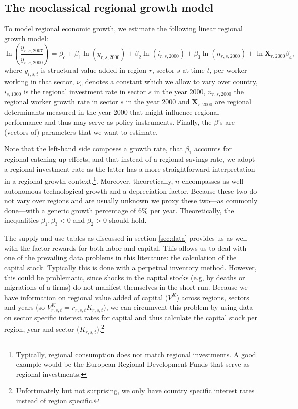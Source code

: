 \documentclass[11pt,parskip,abstracton,notitlepage, paper=a4]{scrartcl}
\begin{document}
\subsection{The neoclassical regional growth model}

To model regional economic growth, we estimate the following linear regional growth model:
\begin{equation}
	\ln\left(\frac{y_{r,s,2007}}{y_{r,s,2000}}\right)=\beta_c+\beta_1\ln(y_{r,s,2000}) + \beta_2 \ln(i_{r,s, 2000}) + \beta_3 \ln(n_{r,s, 2000}) + \ln{\mathbf{X}_{r, 2000}} \beta_4,
	\label{regionalgrowth}
\end{equation}
where $y_{i,s,t}$ is structural value added in region $r$, sector $s$ at time $t$, per worker working in that sector, $\nu_c$ denotes a constant which we allow to vary over country, $i_{s,1000}$ is the regional investment rate in sector $s$ in the year 2000, $n_{r,s,2000}$ the regional worker growth rate in sector $s$ in the year 2000 and $\mathbf{X}_{r,2000}$ are regional determinants measured in the year 2000 that might influence regional performance and thus may serve as policy instruments. Finally, the $\beta$'s are (vectors of) parameters that we want to estimate. 

Note that the left-hand side composes a growth rate, that $\beta_1$ accounts for regional catching up effects, and that instead of a regional savings rate, we adopt a regional investment rate as the latter has a more straightforward interpretation in a regional growth context.\footnote{Typically, regional consumption does not match regional investments. A good example would be the European Regional Development Funds that serve as regional investments.}. Moreover, theoretically, $n$ encompasses as well autonomous technological growth and a depreciation factor. Because these two do not vary over regions and are usually unknown we proxy these two---as commonly done---with a generic growth percentage of 6\% per year. Theoretically, the inequalities $\beta_1, \beta_3 <0$ and $\beta_2  > 0$ should hold.  

The supply and use tables as discussed in section \ref{sec:data} provides us as well with the factor rewards for both labor and capital. This allows us to deal with one of the prevailing data problems in this literature: the calculation of the capital stock. Typically this is done with a perpetual inventory method. However, this could be problematic, since shocks in the capital stocks (e.g, by deaths or migrations of a firms) do not manifest themselves in the short run. Because we have information on  regional value added of capital ($V^K$) across regions, sectors and years (so $V^K_{r,s,t} = r_{r,s,t} K_{r,s,t}$), we can circumvent this problem by using data on sector specific interest rates for capital and thus calculate the capital stock per region, year and sector ($K_{r,s,t}$).\footnote{Unfortunately but not surprising, we only have country specific interest rates instead of region specific.}
\end{document}
